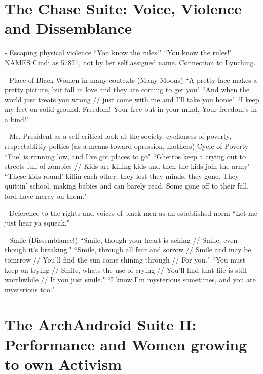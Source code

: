 \documentclass[a4paper, 11pt]{article} %
\begin{document}

\section*{The Chase Suite: Voice, Violence and Dissemblance}
- Escaping physical violence
``You know the rules!"\cite{wolfmasters}
``You know the rules!"\cite{happyhunting}
NAMES Cindi as 57821, not by her self assigned name. 
Connection to Lynching.

- Place of Black Women in many contexts (Many Moons)
``A pretty face makes a pretty picture, but fall in love and they are coming to get you"\cite{happyhunting}
``And when the world just treats you wrong // just come with me and I'll take you home" \cite{manymoons}
``I keep my feet on solid ground. Freedom! Your free but in your mind, Your freedom's in a bind!"\cite{manymoons}

- Mr. President as a self-critical look at the society, cyclicness of poverty, respectablitiy poltics (as a means toward opression, mothers)
Cycle of Poverty
``Fuel is running low, and I've got places to go"\cite{mrpresident}
``Ghettos keep a crying out to streets full of zombies // Kids are killing kids and then the kids join the army"\cite{danceordie}
``These kids round' killin each other, they lost they minds, they gone. They quittin' school, making babies and can barely read. Some gone off to their fall, lord have mercy on them."\cite{sincerelyjane}

- Deference to the rights and voices of black men as an established norm
``Let me just hear ya squeak."\cite{happyhunting}


- Smile (Dissemblance!)
``Smile, though your heart is aching // Smile, even though it's breaking."\cite{smile}
``Smile, through all fear and sorrow // Smile and may be tomrrow // You'll find the sun come shining through // For you."\cite{smile}
``You must keep on trying // Smile, whats the use of crying // You'll find that life is still worthwhile // If you just smile."\cite{smile}
``I know I'm mysterious sometimes, and you are mysterious too."\cite{primetime}


\section*{The ArchAndroid Suite II: Performance and Women growing to own Activism}
\end{document}
